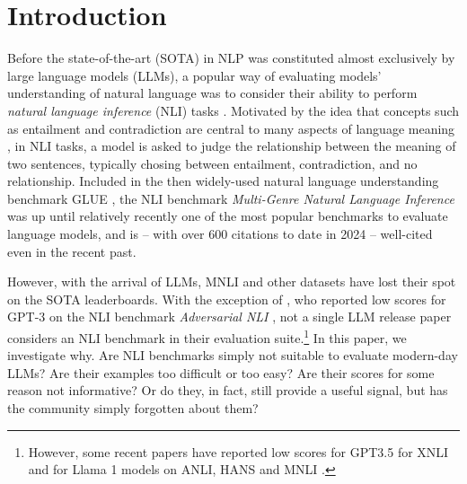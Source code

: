 \section{Introduction}

Before the state-of-the-art (SOTA) in NLP was constituted almost exclusively by large language models (LLMs), a popular way of evaluating models' understanding of natural language was to consider their ability to perform \emph{natural language inference} (NLI) tasks \citep[most famously,][]{bowman-etal-2015-large,williams-etal-2018-broad}.
Motivated by the idea that concepts such as entailment and contradiction are central to many aspects of language meaning \citep{bowman-etal-2015-large}, in NLI tasks, a model is asked to judge the relationship between the meaning of two sentences, typically chosing between entailment, contradiction, and no relationship.
Included in the then widely-used natural language understanding benchmark GLUE \citep{wang2019glue}, the NLI benchmark \emph{Multi-Genre Natural Language Inference}  \citep[MNLI,][]{williams-etal-2018-broad} was up until relatively recently one of the most popular benchmarks to evaluate language models, and is -- with over 600 citations to date in 2024 -- well-cited even in the recent past.

However, with the arrival of LLMs, MNLI and other datasets have lost their spot on the SOTA leaderboards.
With the exception of \citet{brown2020language},  who reported low scores for GPT-3 on the NLI benchmark \emph{Adversarial NLI} \citep[ANLI,][]{nie-etal-2020-adversarial}, not a single LLM release paper considers an NLI benchmark in their evaluation suite.\footnote{However, some recent papers have reported low scores for GPT3.5 for XNLI \citep{ohmer2024form,ohmer-etal-2023-separating} and for Llama 1 models on ANLI, HANS \citep{mccoy-etal-2019-right} and MNLI \citep{weber-etal-2023-mind}.}
In this paper, we investigate why.
Are NLI benchmarks simply not suitable to evaluate modern-day LLMs? 
Are their examples too difficult or too easy?
Are their scores for some reason not informative?
Or do they, in fact, still provide a useful signal, but has the community simply forgotten about them?

